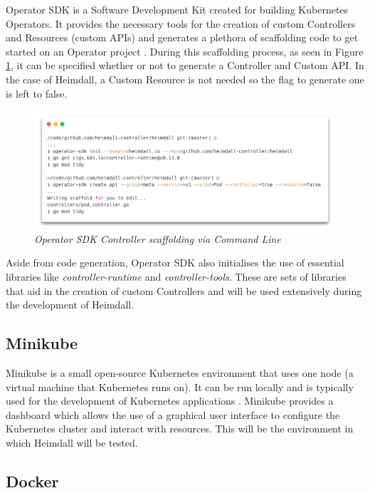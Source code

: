 \documentclass{article}
\begin{document}
Operator SDK is a Software Development Kit created for building Kubernetes Operators. It provides the necessary tools for the creation of custom Controllers and Resources (custom APIs) and generates a plethora of scaffolding code to get started on an Operator project \cite{osdk-overview}. During this scaffolding process, as seen in Figure \ref{osdk-img}, it can be specified whether or not to generate a Controller and Custom API. In the case of Heimdall, a Custom Resource is not needed so the flag to generate one is left to false.

\begin{figure}[H]
    \centering
    \includegraphics[width=160mm]{tools/osdk.png}
    \caption{\emph{Operator SDK Controller scaffolding via Command Line}}
    \label{osdk-img}
\end{figure}

Aside from code generation, Operator SDK also initialises the use of essential libraries like \emph{controller-runtime} and \emph{controller-tools}. These are sets of libraries that aid in the creation of custom Controllers and will be used extensively during the development of Heimdall.


\subsection{Minikube}

Minikube is a small open-source Kubernetes environment that uses one node (a virtual machine that Kubernetes runs on). It can be run locally and is typically used for the development of Kubernetes applications \cite{minikube-docs}. Minikube provides a dashboard which allows the use of a graphical user interface to configure the Kubernetes cluster and interact with resources. This will be the environment in which Heimdall will be tested. 

 
\subsection{Docker}
\end{document}
